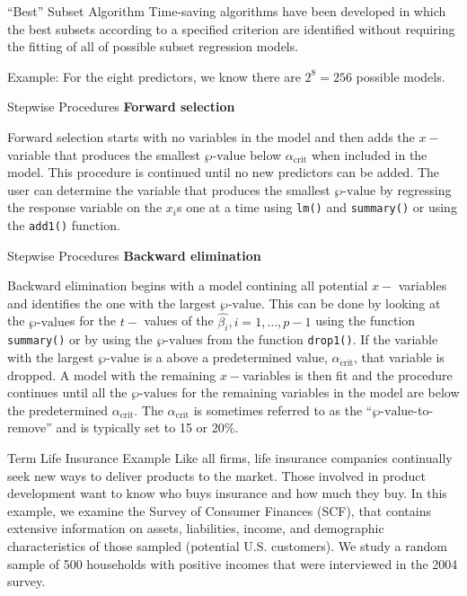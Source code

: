 \documentclass[
  ignorenonframetext,
]{beamer}
\begin{document}
\begin{frame}{``Best'' Subset Algorithm}
\protect\hypertarget{best-subset-algorithm}{}
Time-saving algorithms have been developed in which the best subsets
according to a specified criterion are identified without requiring the
fitting of all of possible subset regression models.

Example: For the eight predictors, we know there are \(2^8=256\)
possible models.
\end{frame}

\begin{frame}[fragile]{Stepwise Procedures}
\protect\hypertarget{stepwise-procedures}{}
\textbf{Forward selection}

Forward selection starts with no variables in the model and then adds
the \(x-\)variable that produces the smallest \(\wp\text{-value}\) below
\(\alpha_{\text{crit}}\) when included in the model. This procedure is
continued until no new predictors can be added. The user can determine
the variable that produces the smallest \(\wp\text{-value}\) by
regressing the response variable on the \(x_i\)s one at a time using
\texttt{lm()} and \texttt{summary()} or using the \texttt{add1()}
function.
\end{frame}

\begin{frame}[fragile]{Stepwise Procedures}
\protect\hypertarget{stepwise-procedures-1}{}
\textbf{Backward elimination}

Backward elimination begins with a model contining all potential \(x-\)
variables and identifies the one with the largest \(\wp\text{-value}\).
This can be done by looking at the \(\wp\text{-value}\)s for the \(t-\)
values of the \(\hat{\beta_i}, i = 1, \ldots,p-1\) using the function
\texttt{summary()} or by using the \(\wp\text{-value}\)s from the
function \texttt{drop1()}. If the variable with the largest
\(\wp\text{-value}\) is a above a predetermined value,
\(\alpha_{\text{crit}}\), that variable is dropped. A model with the
remaining \(x-\)variables is then fit and the procedure continues until
all the \(\wp\text{-value}\)s for the remaining variables in the model
are below the predetermined \(\alpha_{\text{crit}}\). The
\(\alpha_{\text{crit}}\) is sometimes referred to as the
``\(\wp\text{-value}\)-to-remove'' and is typically set to 15 or 20\%.
\end{frame}

\begin{frame}{Term Life Insurance Example}
\protect\hypertarget{term-life-insurance-example-4}{}
Like all firms, life insurance companies continually seek new ways to
deliver products to the market. Those involved in product development
want to know who buys insurance and how much they buy. In this example,
we examine the Survey of Consumer Finances (SCF), that contains
extensive information on assets, liabilities, income, and demographic
characteristics of those sampled (potential U.S. customers). We study a
random sample of 500 households with positive incomes that were
interviewed in the 2004 survey.
\end{frame}
\end{document}
